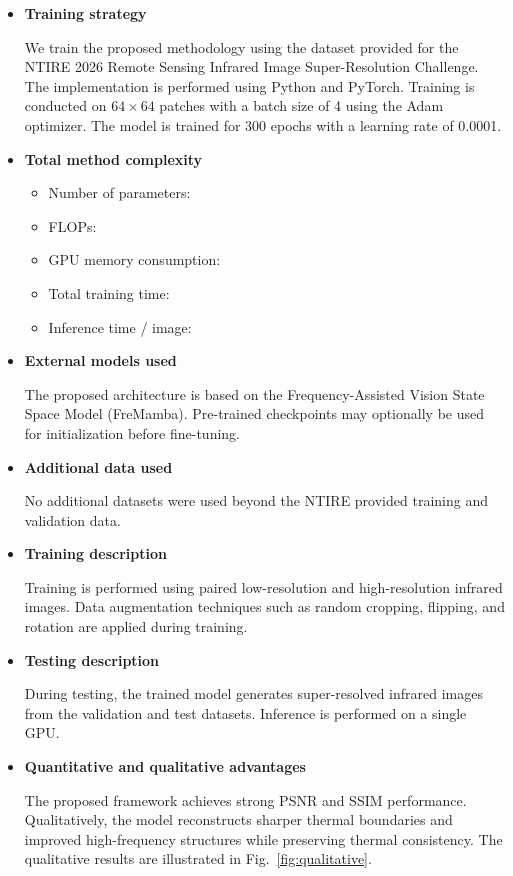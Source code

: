 \documentclass[conference]{IEEEtran}
\begin{document}
\begin{itemize}

\item \textbf{Training strategy}

We train the proposed methodology using the dataset provided for the NTIRE 2026 Remote Sensing Infrared Image Super-Resolution Challenge. The implementation is performed using Python and PyTorch. Training is conducted on $64\times64$ patches with a batch size of 4 using the Adam optimizer. The model is trained for 300 epochs with a learning rate of 0.0001.

\item \textbf{Total method complexity}

\begin{itemize}
\item Number of parameters:
\item FLOPs:
\item GPU memory consumption:
\item Total training time:
\item Inference time / image:
\end{itemize}

\item \textbf{External models used}

The proposed architecture is based on the Frequency-Assisted Vision State Space Model (FreMamba). Pre-trained checkpoints may optionally be used for initialization before fine-tuning.

\item \textbf{Additional data used}

No additional datasets were used beyond the NTIRE provided training and validation data.

\item \textbf{Training description}

Training is performed using paired low-resolution and high-resolution infrared images. Data augmentation techniques such as random cropping, flipping, and rotation are applied during training.

\item \textbf{Testing description}

During testing, the trained model generates super-resolved infrared images from the validation and test datasets. Inference is performed on a single GPU.

\item \textbf{Quantitative and qualitative advantages}

The proposed framework achieves strong PSNR and SSIM performance. Qualitatively, the model reconstructs sharper thermal boundaries and improved high-frequency structures while preserving thermal consistency. The qualitative results are illustrated in Fig.~\ref{fig:qualitative}.

\end{itemize}
\end{document}
